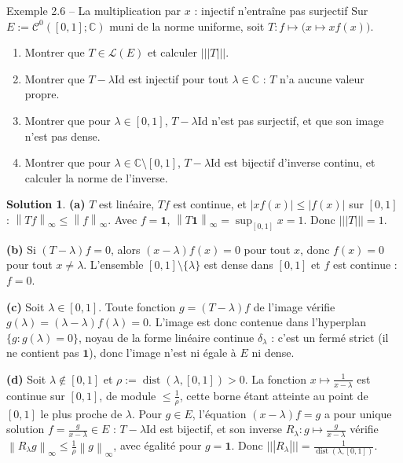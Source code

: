 \documentclass[11pt,a4paper]{article}
\newcommand{\C}{\mathbb{C}}
\newcommand{\norm}[1]{\left\|#1\right\|}
\newcommand{\opnorm}[1]{|\!|\!|#1|\!|\!|}
\newcommand{\Lc}{\mathcal{L}}
\newcommand{\Cz}{\mathcal{C}^0}
\DeclareMathOperator{\dist}{dist}
\theoremstyle{definition}
\newtheorem*{solution}{Solution}
\begin{document}
\begin{exo}{Exemple 2.6 -- La multiplication par $x$ : injectif n'entraîne pas surjectif}
Sur $E:=\Cz([0,1];\C)$ muni de la norme uniforme, soit $T:f\mapsto\big(x\mapsto xf(x)\big)$.
\begin{enumerate}[label=(\alph*)]
  \item Montrer que $T\in\Lc(E)$ et calculer $\opnorm T$.
  \item Montrer que $T-\lambda\mathrm{Id}$ est injectif pour tout $\lambda\in\C$ : $T$ n'a aucune valeur propre.
  \item Montrer que pour $\lambda\in[0,1]$, $T-\lambda\mathrm{Id}$ n'est pas surjectif, et que son image n'est pas dense.
  \item Montrer que pour $\lambda\in\C\setminus[0,1]$, $T-\lambda\mathrm{Id}$ est bijectif d'inverse continu, et calculer la norme de l'inverse.
\end{enumerate}
\end{exo}

\begin{solution}
\noindent\textbf{(a)} $T$ est linéaire, $Tf$ est continue, et $|xf(x)|\le|f(x)|$ sur $[0,1]$ : $\norm{Tf}_\infty\le\norm f_\infty$. Avec $f=\mathbf 1$, $\norm{T\mathbf 1}_\infty=\sup_{[0,1]}x=1$. Donc $\opnorm T=1$.

\medskip
\noindent\textbf{(b)} Si $(T-\lambda)f=0$, alors $(x-\lambda)f(x)=0$ pour tout $x$, donc $f(x)=0$ pour tout $x\ne\lambda$. L'ensemble $[0,1]\setminus\{\lambda\}$ est dense dans $[0,1]$ et $f$ est continue : $f=0$.

\medskip
\noindent\textbf{(c)} Soit $\lambda\in[0,1]$. Toute fonction $g=(T-\lambda)f$ de l'image vérifie $g(\lambda)=(\lambda-\lambda)f(\lambda)=0$. L'image est donc contenue dans l'hyperplan $\{g:g(\lambda)=0\}$, noyau de la forme linéaire continue $\delta_\lambda$ : c'est un fermé strict (il ne contient pas $\mathbf 1$), donc l'image n'est ni égale à $E$ ni dense.

\medskip
\noindent\textbf{(d)} Soit $\lambda\notin[0,1]$ et $\rho:=\dist(\lambda,[0,1])>0$. La fonction $x\mapsto\frac1{x-\lambda}$ est continue sur $[0,1]$, de module $\le\frac1\rho$, cette borne étant atteinte au point de $[0,1]$ le plus proche de $\lambda$. Pour $g\in E$, l'équation $(x-\lambda)f=g$ a pour unique solution $f=\frac g{x-\lambda}\in E$ : $T-\lambda\mathrm{Id}$ est bijectif, et son inverse $R_\lambda:g\mapsto\frac g{x-\lambda}$ vérifie $\norm{R_\lambda g}_\infty\le\frac1\rho\norm g_\infty$, avec égalité pour $g=\mathbf 1$. Donc $\opnorm{R_\lambda}=\frac1{\dist(\lambda,[0,1])}$.
\end{solution}
\end{document}
